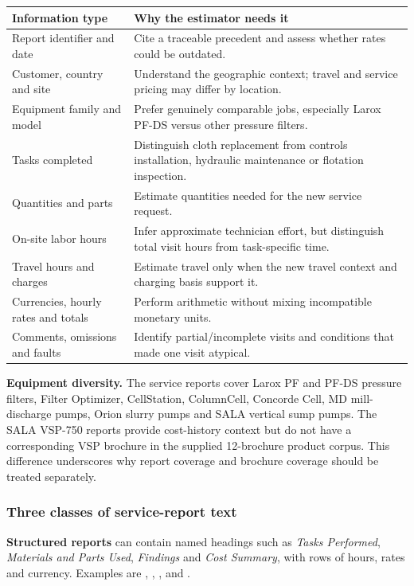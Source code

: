 \documentclass[11pt,a4paper]{article}
\DeclareRobustCommand{\code}[1]{{\ttfamily\small\detokenize{#1}}}
\begin{document}
\begin{tabularx}{\textwidth}{@{}L{44mm}Y@{}}
\toprule\textbf{Information type} & \textbf{Why the estimator needs it}\\\midrule
Report identifier and date & Cite a traceable precedent and assess whether rates could be outdated.\\
Customer, country and site & Understand the geographic context; travel and service pricing may differ by location.\\
Equipment family and model & Prefer genuinely comparable jobs, especially Larox PF-DS versus other pressure filters.\\
Tasks completed & Distinguish cloth replacement from controls installation, hydraulic maintenance or flotation inspection.\\
Quantities and parts & Estimate quantities needed for the new service request.\\
On-site labor hours & Infer approximate technician effort, but distinguish total visit hours from task-specific time.\\
Travel hours and charges & Estimate travel only when the new travel context and charging basis support it.\\
Currencies, hourly rates and totals & Perform arithmetic without mixing incompatible monetary units.\\
Comments, omissions and faults & Identify partial/incomplete visits and conditions that made one visit atypical.\\
\bottomrule
\end{tabularx}

\textbf{Equipment diversity.} The service reports cover Larox PF and PF-DS pressure filters, Filter Optimizer, CellStation, ColumnCell, Concorde Cell, MD mill-discharge pumps, Orion slurry pumps and SALA vertical sump pumps. The SALA VSP-750 reports provide cost-history context but do not have a corresponding VSP brochure in the supplied 12-brochure product corpus. This difference underscores why report coverage and brochure coverage should be treated separately.

\subsubsection{Three classes of service-report text}
\textbf{Structured reports} can contain named headings such as \emph{Tasks Performed}, \emph{Materials and Parts Used}, \emph{Findings} and \emph{Cost Summary}, with rows of hours, rates and currency. Examples are \code{FSR-0014}, \code{FSR-0015}, \code{FSR-0027}, and \code{FSR-0031}.
\end{document}
